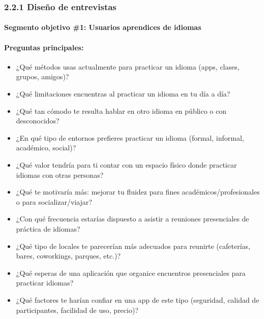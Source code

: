\subsubsection{2.2.1 Diseño de
entrevistas}\label{report__20-cap2-requirements-analysis.md__diseuxf1o-de-entrevistas}

\paragraph{Segmento objetivo \#1: Usuarios aprendices de
idiomas}\label{report__20-cap2-requirements-analysis.md__segmento-objetivo-1-usuarios-aprendices-de-idiomas}

\paragraph{Preguntas
principales:}\label{report__20-cap2-requirements-analysis.md__preguntas-principales}

\begin{itemize}
\tightlist
\item
  ¿Qué métodos usas actualmente para practicar un idioma (apps, clases,
  grupos, amigos)?
\item
  ¿Qué limitaciones encuentras al practicar un idioma en tu día a día?
\item
  ¿Qué tan cómodo te resulta hablar en otro idioma en público o con
  desconocidos?
\item
  ¿En qué tipo de entornos prefieres practicar un idioma (formal,
  informal, académico, social)?
\item
  ¿Qué valor tendría para ti contar con un espacio físico donde
  practicar idiomas con otras personas?
\item
  ¿Qué te motivaría más: mejorar tu fluidez para fines
  académicos/profesionales o para socializar/viajar?
\item
  ¿Con qué frecuencia estarías dispuesto a asistir a reuniones
  presenciales de práctica de idiomas?
\item
  ¿Qué tipo de locales te parecerían más adecuados para reunirte
  (cafeterías, bares, coworkings, parques, etc.)?
\item
  ¿Qué esperas de una aplicación que organice encuentros presenciales
  para practicar idiomas?
\item
  ¿Qué factores te harían confiar en una app de este tipo (seguridad,
  calidad de participantes, facilidad de uso, precio)?
\end{itemize}

